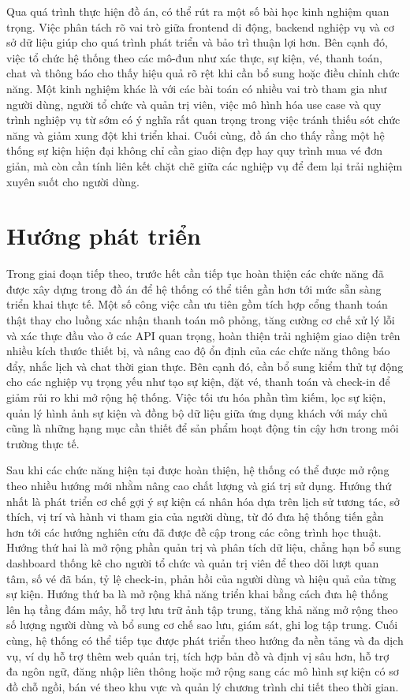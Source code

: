 \documentclass[../DoAn.tex]{subfiles}
\begin{document}
Qua quá trình thực hiện đồ án, có thể rút ra một số bài học kinh nghiệm quan trọng. Việc phân tách rõ vai trò giữa frontend di động, backend nghiệp vụ và cơ sở dữ liệu giúp cho quá trình phát triển và bảo trì thuận lợi hơn. Bên cạnh đó, việc tổ chức hệ thống theo các mô-đun như xác thực, sự kiện, vé, thanh toán, chat và thông báo cho thấy hiệu quả rõ rệt khi cần bổ sung hoặc điều chỉnh chức năng. Một kinh nghiệm khác là với các bài toán có nhiều vai trò tham gia như người dùng, người tổ chức và quản trị viên, việc mô hình hóa use case và quy trình nghiệp vụ từ sớm có ý nghĩa rất quan trọng trong việc tránh thiếu sót chức năng và giảm xung đột khi triển khai. Cuối cùng, đồ án cho thấy rằng một hệ thống sự kiện hiện đại không chỉ cần giao diện đẹp hay quy trình mua vé đơn giản, mà còn cần tính liên kết chặt chẽ giữa các nghiệp vụ để đem lại trải nghiệm xuyên suốt cho người dùng.

\section{Hướng phát triển}
Trong giai đoạn tiếp theo, trước hết cần tiếp tục hoàn thiện các chức năng đã được xây dựng trong đồ án để hệ thống có thể tiến gần hơn tới mức sẵn sàng triển khai thực tế. Một số công việc cần ưu tiên gồm tích hợp cổng thanh toán thật thay cho luồng xác nhận thanh toán mô phỏng, tăng cường cơ chế xử lý lỗi và xác thực đầu vào ở các API quan trọng, hoàn thiện trải nghiệm giao diện trên nhiều kích thước thiết bị, và nâng cao độ ổn định của các chức năng thông báo đẩy, nhắc lịch và chat thời gian thực. Bên cạnh đó, cần bổ sung kiểm thử tự động cho các nghiệp vụ trọng yếu như tạo sự kiện, đặt vé, thanh toán và check-in để giảm rủi ro khi mở rộng hệ thống. Việc tối ưu hóa phần tìm kiếm, lọc sự kiện, quản lý hình ảnh sự kiện và đồng bộ dữ liệu giữa ứng dụng khách với máy chủ cũng là những hạng mục cần thiết để sản phẩm hoạt động tin cậy hơn trong môi trường thực tế.

Sau khi các chức năng hiện tại được hoàn thiện, hệ thống có thể được mở rộng theo nhiều hướng mới nhằm nâng cao chất lượng và giá trị sử dụng. Hướng thứ nhất là phát triển cơ chế gợi ý sự kiện cá nhân hóa dựa trên lịch sử tương tác, sở thích, vị trí và hành vi tham gia của người dùng, từ đó đưa hệ thống tiến gần hơn tới các hướng nghiên cứu đã được đề cập trong các công trình học thuật. Hướng thứ hai là mở rộng phần quản trị và phân tích dữ liệu, chẳng hạn bổ sung dashboard thống kê cho người tổ chức và quản trị viên để theo dõi lượt quan tâm, số vé đã bán, tỷ lệ check-in, phản hồi của người dùng và hiệu quả của từng sự kiện. Hướng thứ ba là mở rộng khả năng triển khai bằng cách đưa hệ thống lên hạ tầng đám mây, hỗ trợ lưu trữ ảnh tập trung, tăng khả năng mở rộng theo số lượng người dùng và bổ sung cơ chế sao lưu, giám sát, ghi log tập trung. Cuối cùng, hệ thống có thể tiếp tục được phát triển theo hướng đa nền tảng và đa dịch vụ, ví dụ hỗ trợ thêm web quản trị, tích hợp bản đồ và định vị sâu hơn, hỗ trợ đa ngôn ngữ, đăng nhập liên thông hoặc mở rộng sang các mô hình sự kiện có sơ đồ chỗ ngồi, bán vé theo khu vực và quản lý chương trình chi tiết theo thời gian.
\end{document}
